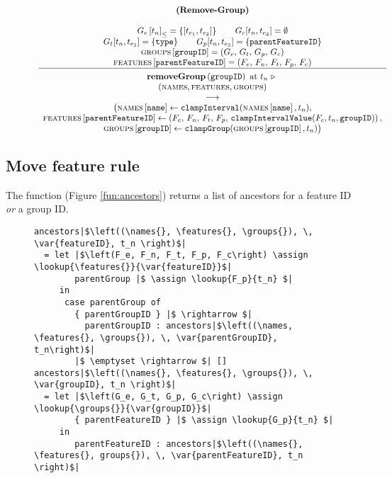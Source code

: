 \begin{figure}[h]
    \renewcommand{\arraystretch}{1.1}
    \sossize$$\begin{array}{c}
      \ntyperule{Remove-Group}
      {\\
        \containing{G_e}{t_n} = \set{\interval{t_{e_1}}{t_{e_2}}} \qquad
        G_c \interval{t_{n}}{t_{e_2}} = \emptyset \\
        G_t \interval{t_n}{t_{e_2}} = \set{\var{type}} \qquad
        G_p \interval{t_n}{t_{e_2}} = \set{\var{parentFeatureID}} \\
        \lookup{\groups{}}{\var{groupID}} = \left( G_e,\, G_t,\, G_p,\, G_c \right) \\
        \lookup{\features{}}{\var{parentFeatureID}} = \left( F_e,\, F_n,\, F_t,\, F_p,\, F_c \right)
      }
      {
        \textbf{removeGroup}\left( \var{groupID}\right) \text{ at } t_n \shove \\
        (\names{}, \features{}, \groups{}) \\
        \transition \\
        \big(\lookup{\names{}}{\var{name}} \assign \var{clampInterval}(\lookup{\names{}}{\var{name}}, t_n),\\
          \lookup{\features{}}{\var{parentFeatureID}} \assign \left(F_e, \, F_n, \, F_t, \, F_p, \, \var{clampIntervalValue}(F_c, t_n, \var{groupID})\right) ,\\
        \lookup{\groups{}}{\var{groupID}} \assign \var{clampGroup}(\lookup{\groups{}}{\var{groupID}}, t_n) \big)
      }
    \end{array}$$
  \caption{\label{rule:remove-group}}
\end{figure}

\subsection{Move feature rule}
\label{sub:move-feature-rule}

The  function (Figure \vref{fun:ancestors}) returns a list of ancestors for a feature ID \emph{or} a group ID. 

\begin{figure}[h]
  \begin{verbatim}
ancestors|$\left((\names{}, \features{}, \groups{}), \, \var{featureID}, t_n \right)$| 
  = let |$\left(F_e, F_n, F_t, F_p, F_c\right) \assign     \lookup{\features{}}{\var{featureID}}$|
        parentGroup |$ \assign \lookup{F_p}{t_n} $|
     in 
      case parentGroup of
        { parentGroupID } |$ \rightarrow $| 
          parentGroupID : ancestors|$\left((\names, \features{}, \groups{}), \, \var{parentGroupID}, t_n\right)$|
        |$ \emptyset \rightarrow $| []
ancestors|$\left((\names{}, \features{}, \groups{}), \, \var{groupID}, t_n \right)$| 
  = let |$\left(G_e, G_t, G_p, G_c\right) \assign     \lookup{\groups{}}{\var{groupID}}$|
        { parentFeatureID } |$ \assign \lookup{G_p}{t_n} $|
     in 
        parentFeatureID : ancestors|$\left((\names{}, \features{}, groups{}), \, \var{parentFeatureID}, t_n \right)$| 
  \end{verbatim}
  \caption{\label{fun:ancestors}}
\end{figure}

